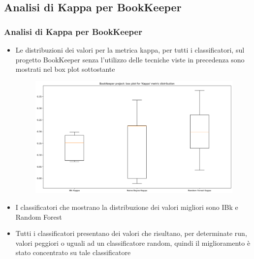 \documentclass[10pt]{beamer}
\begin{document}
\begin{frame}
\section{Analisi di Kappa per BookKeeper}
\frametitle{Analisi di Kappa per BookKeeper}
\begin{itemize}
\item Le distribuzioni dei valori per la metrica kappa, per tutti i classificatori, sul progetto BookKeeper senza l'utilizzo delle tecniche viste in precedenza sono mostrati nel box plot sottostante
\begin{figure}
\includegraphics[scale=0.25]{images/k_base_bk}
\end{figure}
\item I classificatori che mostrano la distribuzione dei valori migliori sono IBk e Random Forest
\item Tutti i classificatori presentano dei valori che risultano, per determinate run, valori peggiori o uguali ad un classificatore random, quindi il miglioramento è stato concentrato su tale classificatore
\end{itemize}
\end{frame}
\end{document}
